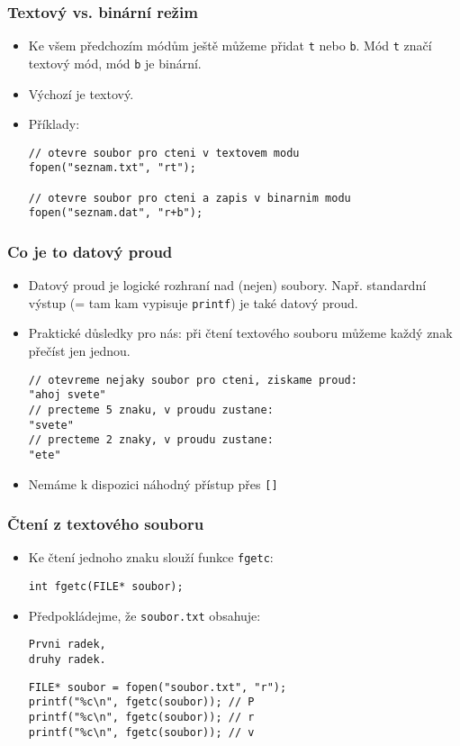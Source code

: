 \documentclass{beamer}
\newenvironment{itemizex}%
  {\large \begin{itemize}%
    \setlength{\itemsep}{8pt}%
    \setlength{\parskip}{8pt}}%
  {\end{itemize}}
\begin{document}
\begin{frame}[t,fragile]\frametitle{Textový vs. binární režim} 
    \begin{itemizex}
        \item Ke všem předchozím módům ještě můžeme přidat \texttt{t} nebo \texttt{b}. Mód \texttt{t} značí textový mód, mód \texttt{b} je binární. 
        \item Výchozí je textový.
        \item Příklady:
\begin{verbatim} 
// otevre soubor pro cteni v textovem modu
fopen("seznam.txt", "rt");

// otevre soubor pro cteni a zapis v binarnim modu
fopen("seznam.dat", "r+b");
\end{verbatim}
    \end{itemizex}
\end{frame}


\begin{frame}[t,fragile]\frametitle{Co je to datový proud} 
    \begin{itemize}
        \item Datový proud je logické rozhraní nad (nejen) soubory. Např. standardní výstup (= tam kam vypisuje \texttt{printf}) je také datový proud. 
        \item Praktické důsledky pro nás: při čtení textového souboru můžeme každý znak přečíst jen jednou.
\begin{verbatim} 
// otevreme nejaky soubor pro cteni, ziskame proud:
"ahoj svete"
// precteme 5 znaku, v proudu zustane:
"svete"
// precteme 2 znaky, v proudu zustane:
"ete"
\end{verbatim}
        \item Nemáme k dispozici náhodný přístup přes \texttt{[]}
    \end{itemize}
\end{frame}


\begin{frame}[t,fragile]\frametitle{Čtení z textového souboru} 
    \begin{itemizex}
        \item Ke čtení jednoho znaku slouží funkce \texttt{fgetc}:
\begin{verbatim} 
int fgetc(FILE* soubor);
\end{verbatim}
        \item Předpokládejme, že \texttt{soubor.txt} obsahuje:
\begin{verbatim} 
Prvni radek,
druhy radek.
\end{verbatim}

\begin{verbatim} 
FILE* soubor = fopen("soubor.txt", "r");
printf("%c\n", fgetc(soubor)); // P
printf("%c\n", fgetc(soubor)); // r
printf("%c\n", fgetc(soubor)); // v
\end{verbatim}
    \end{itemizex}
\end{frame}
\end{document}
